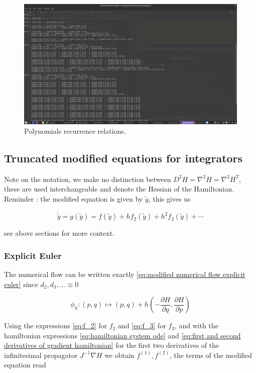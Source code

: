 \documentclass[12pt]{article}
\begin{document}
\begin{figure}[H]
    \centering
    \includegraphics[width=0.9\linewidth]{Figures/truncated_polynomial_coefficients.png}
    \caption{Polynomials recurrence relations.}
    \label{fig:polynomial recurrence relations}
\end{figure}

\subsection{Truncated modified equations for integrators}
\label{section:truncated modified equations}
Note on the notation, we make no distinction between $D^2H = \nabla^2H = \nabla^2H^T$, these are used interchangeable and denote the Hessian of the Hamiltonian. Reminder : the modified equation is given by $\widetilde y$, this gives us

$$\dot{\widetilde y} = g(\widetilde y) = f(\widetilde y) + hf_2(\widetilde y) + h^2f_3(\widetilde y) + \cdots$$

see above sections for more context.

\subsubsection{Explicit Euler}

The numerical flow can be written exactly \eqref{eq:modified numerical flow explicit euler} since $d_2,d_3,... \equiv 0$

\begin{equation}\label{eq:modified numerical flow explicit euler}
    \phi_h : (p,q) \mapsto (p,q) + h\left( -\frac{\partial H}{\partial q}, \frac{\partial H}{\partial p} \right)
\end{equation}

Using the expressions \eqref{eq:f_2} for $f_2$ and \eqref{eq:f_3} for $f_3$, and with the hamiltonian expressions \eqref{eq:hamiltonian system ode} and \eqref{eq:first and second derivatives of gradient hamiltonian} for the first two derivatives of the infinitesimal propagator $J^{-1}\nabla H$ we obtain $f^{(1)},f^{(2)}$, the terms of the modified equation read
\end{document}
